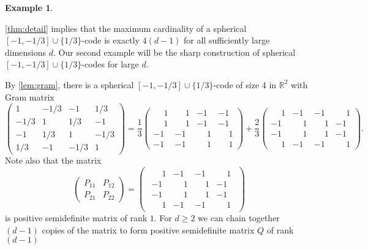 \documentclass[reqno, 11pt]{amsart}
\theoremstyle{definition}
\newtheorem{example}[theorem]{Example}
\theoremstyle{remark}
\newcommand{\RR}{\mathbb{R}}
\begin{document}
\begin{example}\label{ex:uniacute-construction}

\cref{thm:detail} implies that the maximum cardinality of a spherical $[-1, -1/3] \cup \{1/3\}$-code is exactly $4(d - 1)$ for all sufficiently large dimensions $d$. Our second example will be the sharp construction of spherical $[-1, -1/3] \cup \{1/3\}$-codes for large $d$.

	By \cref{lem:gram}, there is a spherical $[-1, -1/3] \cup \{1/3\}$-code of size 4 in $\RR^2$ with Gram matrix
	\[
		\begin{pmatrix}
		1 & -1/3 & -1 & 1/3 \\
		-1/3 & 1 & 1/3 & -1 \\
		-1 & 1/3 & 1 & -1/3 \\
		1/3 & -1 & -1/3 & 1
	\end{pmatrix}
		=
		\frac{1}{3}
			\begin{pmatrix}
			\phantom{+}1 & \phantom{+}1 & -1 & -1 \\
			\phantom{+}1 & \phantom{+}1 & -1 & -1 \\
			-1 & -1 & \phantom{+}1 & \phantom{+}1 \\
			-1 & -1 & \phantom{+}1 & \phantom{+}1
			\end{pmatrix}
		+
		\frac{2}{3}
			\begin{pmatrix}
			\phantom{+}1 & -1 & -1 & \phantom{+}1 \\
			-1 & \phantom{+}1 & \phantom{+}1 & -1 \\
			-1 & \phantom{+}1 & \phantom{+}1 & -1 \\
			\phantom{+}1 & -1 & -1 & \phantom{+}1
		\end{pmatrix}.
\]
Note also that the matrix 
\[
\begin{pmatrix}
	P_{11} & P_{12} \\
	P_{21} & P_{22}
\end{pmatrix}
		=
		\begin{pmatrix}
		\begin{array}{cc|cc}
			\phantom{+}1 & -1 & -1 & \phantom{+}1 \\
			-1 & \phantom{+}1 & \phantom{+}1 & -1 \\
			\hline
			-1 & \phantom{+}1 & \phantom{+}1 & -1 \\
			\phantom{+}1 & -1 & -1 & \phantom{+}1
		\end{array}
\end{pmatrix}
\]
is positive semidefinite matrix of rank $1$. For $d \geq 2$ we can chain together $(d-1)$ copies of the matrix to form positive semidefinite matrix $Q$ of rank $(d-1)$

\end{example}
\end{document}
